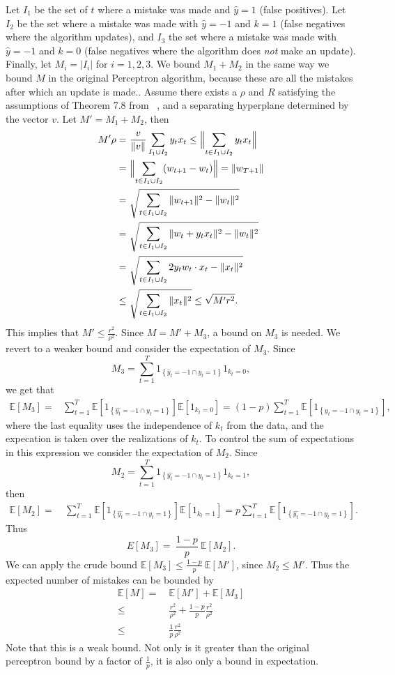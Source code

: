 \documentclass[12pt]{article}
\newcommand{\E}[0]{\mathbb{E}}
\begin{document}
Let $I_1$ be the set of $t$ where a mistake was made and
$\widehat{y}=1$ (false positives).  Let $I_2$ be the set where a mistake was made with
$\widehat{y} = -1$ and $k = 1$ (false negatives where the algorithm updates), and $I_3$ the set where a mistake was
made with $\widehat{y} = -1$ and $k = 0$ (false negatives where the algorithm does {\it not} make an update). Finally, let $M_i = |I_i|$ for $i =
1,2,3$. We bound $M_1 + M_2$ in the same way we bound $M$ in the original Perceptron algorithm, because these are all the mistakes after which an update is made.. Assume there exists a $\rho$ and $R$ satisfying the assumptions of Theorem 7.8 from ~\cite{FML}, and a separating hyperplane determined by the vector $v$. Let $M' = M_1 + M_2$, then
\begin{align*}
M' \rho =&\ \frac{v}{\|v\|}\sum_{I_1 \cup I_2} y_tx_t  \leq \Bigl\|\sum_{t \in I_1 \cup I_2} y_t x_t\Bigr\| \\
=& \ \Bigl\|\sum_{t \in I_1 \cup I_2} (w_{t+1} - w_t) \Bigr\| =  \|w_{T+1} \| \\
=&\ \sqrt{\sum_{t \in I_1 \cup I_2} \|  w_{t+1}\|^2 - \|w_t\|^2 }\\
= &\ \sqrt{\sum_{t \in I_1 \cup I_2} \|  w_{t} + y_t x_t\|^2 - \|w_t\|^2 }\\
= &\ \sqrt{\sum_{t \in I_1 \cup I_2} 2y_t w_t\cdot x_t - \|x_t\|^2} \\
\leq &\ \sqrt{\sum_{t \in I_1 \cup I_2} \|x_t\|^2} \leq \sqrt{M'r^2}.
\end{align*}
This implies that $M' \leq \frac{r^2}{\rho^2}$. Since $M = M' + M_3$, a bound on $M_3$ is needed. We revert to a weaker bound and consider the expectation of
$M_3$. Since 
\[M_3 = \sum_{t=1}^T 1_{\left\{\widehat{y}_t = -1 \cap y_t = 1\right\}}1_{k_t = 0}, \]
we get that
\begin{align*}
\E[M_3] = & \sum_{t=1}^T \E[1_{\left\{\widehat{y_t} = -1 \cap y_t = 1\right\}}]\E[1_{k_t = 0}] = (1 - p)\sum_{t=1}^T \E[1_{\left\{\widehat{y_t} = -1 \cap y_t = 1\right\}}],
\end{align*}
where the last equality uses the independence of $k_t$ from the data, and the expecation is taken over the realizations of $k_t$. To control the sum of expectations in this expression we consider the expectation of $M_2$. Since
\[
M_2 =  \sum_{t=1}^T 1_{\left\{\hat{y_t} = -1 \cap y_t = 1\right\}}1_{k_t = 1},
\]
then
\begin{align*}
\E[M_2] =&\ \sum_{t=1}^T \E[1_{\left\{\hat{y_t} = -1 \cap y_t = 1\right\}}]\E[1_{k_t = 1}] = p\sum_{t=1}^T \E[1_{\left\{\hat{y_t} = -1 \cap y_t = 1\right\}}].
\end{align*}
Thus
\[
E[M_3] = \ \frac{1-p}{p}\ \E[M_2].
\]
We can apply the crude bound $\E[M_3] \leq \frac{1-p}{p}\ \E[M']$, since $M_2 \leq M'$. Thus the expected number of mistakes can be bounded by
\begin{align*}
\E[M]  =  &\ \E[M'] + \E[M_3] \\
\leq & \ \frac{r^2}{\rho^2} + \frac{1-p}{p}\frac{r^2}{\rho^2} \\
\leq  & \ \frac{1}{p}\frac{r^2}{\rho^2}
\end{align*}
Note that this is a weak bound.  Not only is it greater than the
original perceptron bound by a factor of $\frac{1}{p}$, it is also only a
bound in expectation.
\end{document}
